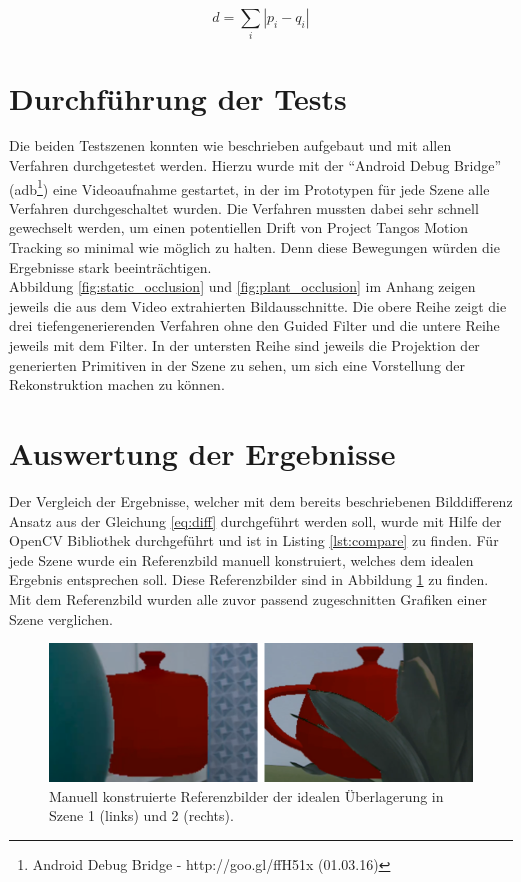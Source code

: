 \begin{equation} \label{eq:diff}
d = \sum_i |p_i-q_i|
\end{equation}

\section{Durchführung der Tests}

Die beiden Testszenen konnten wie beschrieben aufgebaut und mit allen Verfahren durchgetestet werden. Hierzu wurde mit der \enquote{Android Debug Bridge} (adb\footnote{Android Debug Bridge - http://goo.gl/ffH51x (01.03.16)}) eine Videoaufnahme gestartet, in der im Prototypen für jede Szene alle Verfahren durchgeschaltet wurden. Die Verfahren mussten dabei sehr schnell gewechselt werden, um einen potentiellen Drift von Project Tangos Motion Tracking so minimal wie möglich zu halten. Denn diese Bewegungen würden die Ergebnisse stark beeinträchtigen. \\

Abbildung \ref{fig:static_occlusion} und \ref{fig:plant_occlusion} im Anhang zeigen jeweils die aus dem Video extrahierten Bildausschnitte. Die obere Reihe zeigt die drei tiefengenerierenden Verfahren ohne den Guided Filter und die untere Reihe jeweils mit dem Filter. In der untersten Reihe sind jeweils die Projektion der generierten Primitiven in der Szene zu sehen, um sich eine Vorstellung der Rekonstruktion machen zu können.

\section{Auswertung der Ergebnisse}

Der Vergleich der Ergebnisse, welcher mit dem bereits beschriebenen Bilddifferenz Ansatz aus der Gleichung \ref{eq:diff} durchgeführt werden soll, wurde mit Hilfe der OpenCV Bibliothek durchgeführt und ist in Listing \ref{lst:compare} zu finden. Für jede Szene wurde ein Referenzbild manuell konstruiert, welches dem idealen Ergebnis entsprechen soll. Diese Referenzbilder sind in Abbildung \ref{fig:reference} zu finden. Mit dem Referenzbild wurden alle zuvor passend zugeschnitten Grafiken einer Szene verglichen. \\

\begin{figure}[h]
  \centering
	\includegraphics[width=.8\textwidth]{content/images/evaluation/reference.png} 
  \caption{Manuell konstruierte Referenzbilder der idealen Überlagerung in Szene 1 (links) und 2 (rechts).}
  \label{fig:reference}
\end{figure}

